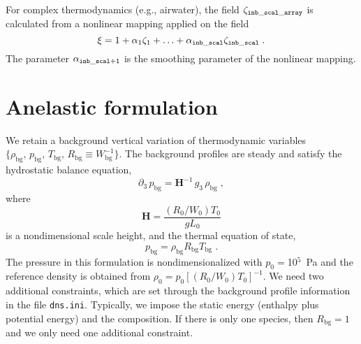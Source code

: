 For complex thermodynamics (e.g., airwater), the field $\zeta_\mathrm{\tt inb\_scal\_array}$ is calculated from a nonlinear mapping applied on the field
\begin{equation}
\xi =1+\alpha_1\zeta_1+\ldots+\alpha_\mathrm{\tt inb\_scal}\zeta_\mathrm{\tt inb\_scal}\;.
\end{equation}
The parameter $\alpha_\mathrm{\tt inb\_scal+1}$ is the smoothing parameter of the nonlinear mapping.

\section{Anelastic formulation}

We retain a background vertical variation of thermodynamic variables $\{\rho_\mathrm{bg},\,p_\mathrm{bg},\,T_\mathrm{bg},\,R_\mathrm{bg}\equiv W_\mathrm{bg}^{-1}\}$. The background profiles are steady and satisfy the hydrostatic balance equation,
\begin{equation}
  \partial_3\,p_\mathrm{bg}=\mathbf{H}^{-1}\, g_3\,\rho_\mathrm{bg}\;,
\end{equation}
where 
\begin{equation}
  \mathbf{H} = \frac{(R_0/W_0)T_0}{gL_0}
\end{equation}
is a nondimensional scale height, and the thermal equation of state,
\begin{equation}
  p_\mathrm{bg}  = \rho_\mathrm{bg} R_\mathrm{bg} T_\mathrm{bg} \;.
\end{equation}
The pressure in this formulation is nondimensionalized with $p_0=$10$^5$~Pa and the reference density is obtained from $\rho_0=p_0[(R_0/W_0)T_0]^{-1}$. We need two additional constraints, which are set through the background profile information in the file {\tt dns.ini}. Typically, we impose the static energy (enthalpy plus potential energy) and the composition.
%
If there is only one species, then $R_\mathrm{bg}=1$ and we only need one additional constraint.

